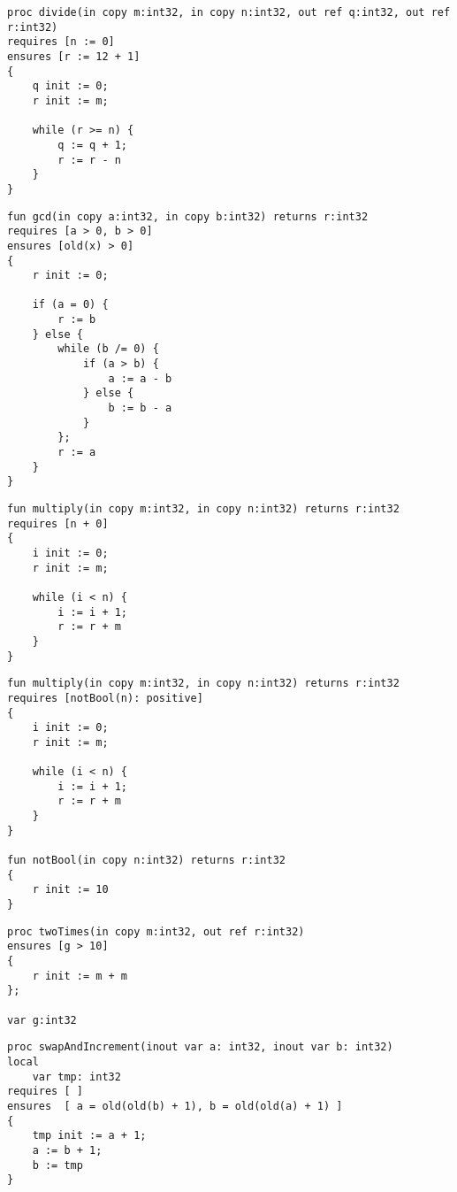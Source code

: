 \begin{lstlisting}[caption=Wert einer Variable in der pre-/postcondition ändern]
proc divide(in copy m:int32, in copy n:int32, out ref q:int32, out ref r:int32)
requires [n := 0]
ensures [r := 12 + 1]
{
    q init := 0;
    r init := m;

    while (r >= n) {
        q := q + 1;
        r := r - n
    }
}
\end{lstlisting}

\begin{lstlisting}[caption=Zugriff auf nicht vorhandene Variable in der old Funktion]
fun gcd(in copy a:int32, in copy b:int32) returns r:int32
requires [a > 0, b > 0]
ensures [old(x) > 0]
{
    r init := 0;
    
    if (a = 0) {
        r := b
    } else {
        while (b /= 0) {
            if (a > b) {
                a := a - b
            } else {
                b := b - a
            }
        };
        r := a
    }
}
\end{lstlisting}

\begin{lstlisting}[caption=Eine nicht Boolsche Expression in der Condition List]
fun multiply(in copy m:int32, in copy n:int32) returns r:int32
requires [n + 0]
{
    i init := 0;
    r init := m;

    while (i < n) {
        i := i + 1;
        r := r + m
    }
}
\end{lstlisting}

\begin{lstlisting}[caption=Eine Funktion in der Condition List welche keinen boolschen Wert zurückliefert]
fun multiply(in copy m:int32, in copy n:int32) returns r:int32
requires [notBool(n): positive]
{
    i init := 0;
    r init := m;

    while (i < n) {
        i := i + 1;
        r := r + m
    }
}

fun notBool(in copy n:int32) returns r:int32
{
    r init := 10
}
\end{lstlisting}

\begin{lstlisting}[caption=Beispiel mit Zugriff auf globale Variable welche nicht in der globalImportList importiert wurde]
proc twoTimes(in copy m:int32, out ref r:int32)
ensures [g > 10]
{
    r init := m + m
};

var g:int32

\end{lstlisting}

\begin{lstlisting}[caption=Auf die Funktion old darf im preexecution State nicht zugegriffen werden.]
proc swapAndIncrement(inout var a: int32, inout var b: int32)
local 
    var tmp: int32
requires [ ]
ensures  [ a = old(old(b) + 1), b = old(old(a) + 1) ]
{
    tmp init := a + 1;
    a := b + 1;
    b := tmp
}

\end{lstlisting}
                                                                         
